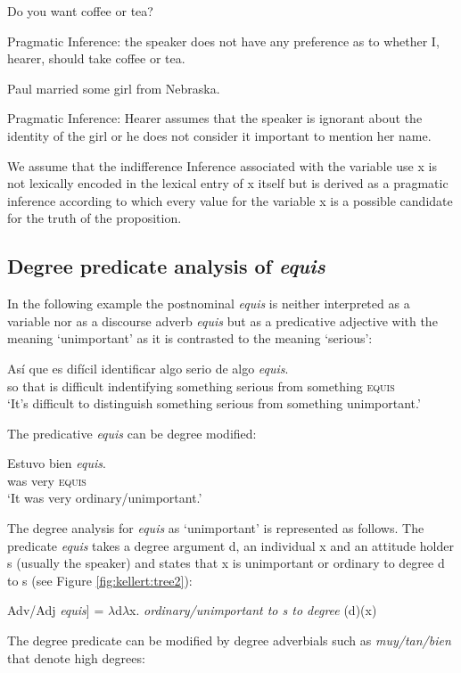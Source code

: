 \documentclass[output=paper
,modfonts
,nonflat]{langsci/langscibook}
\begin{document}
\ea Do you want coffee or tea?
\par
Pragmatic Inference: the speaker does not have any preference as to whether I, hearer, should take coffee or tea.
\z

\ea Paul married some girl from Nebraska.
\par
Pragmatic Inference: Hearer assumes that the speaker is ignorant about the 	identity of the girl or he does not consider it important to mention her name.
\z

We assume that the indifference Inference associated with the variable use x is not lexically encoded in the lexical entry of x itself but is derived as a pragmatic inference according to which every value for the variable x is a possible candidate for the truth of the proposition.

\subsection{Degree predicate analysis of \textit{equis}}\label{sec:kellert:3.3}
In the following example the postnominal \textit{equis} is neither interpreted as a variable nor as a discourse adverb \textit{equis} but as a predicative adjective with the meaning ‘unimportant’ as it is contrasted to the meaning ‘serious’:

\ea
\gll Así que es difícil identificar algo serio de algo \textit{equis}.\\
so that is difficult indentifying something serious from something	\textsc{equis}\\
\glt ‘It’s difficult to distinguish something serious from something unimportant.’
\z

The predicative \textit{equis} can be degree modified:

\ea
\gll Estuvo bien \textit{equis}.\\
was very \textsc{equis}\\
\glt `It was very ordinary/unimportant.’
\z

The degree analysis for \textit{equis} as ‘unimportant’ is represented as follows. The predicate \textit{equis} takes a degree argument d, an individual x and an attitude holder s (usually the speaker) and states that x is unimportant or ordinary to degree d to s (see Figure \ref{fig:kellert:tree2}):

\ea {[}Adv/Adj \textit{equis}{]} = $\lambda$d$\lambda$x. \textit{ordinary/unimportant to s to degree} (d)(x)
\z

The degree predicate can be modified by degree adverbials such as \textit{muy/tan/bien} that denote high degrees:
\end{document}
